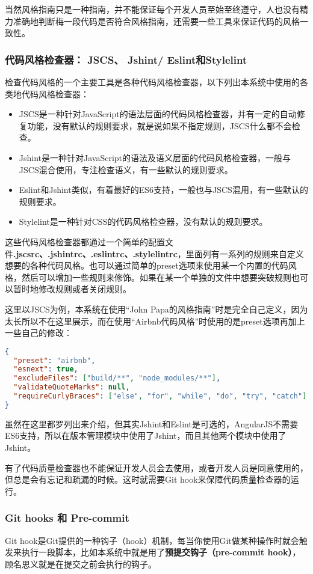 当然风格指南只是一种指南，并不能保证每个开发人员至始至终遵守，人也没有精力准确地判断梅一段代码是否符合风格指南，还需要一些工具来保证代码的风格一致性。
\subsubsection{代码风格检查器： JSCS、 Jshint/ Eslint和Stylelint}
检查代码风格的一个主要工具是各种代码风格检查器，以下列出本系统中使用的各类地代码风格检查器：
\begin{itemize}
  \item JSCS是一种针对JavaScript的语法层面的代码风格检查器，并有一定的自动修复功能，没有默认的规则要求，就是说如果不指定规则，JSCS什么都不会检查。
  \item Jshint是一种针对JavaScript的语法及语义层面的代码风格检查器，一般与JSCS混合使用，专注检查语义，有一些默认的规则要求。
  \item Eslint和Jshint类似，有着最好的ES6支持，一般也与JSCS混用，有一些默认的规则要求。
  \item Stylelint是一种针对CSS的代码风格检查器，没有默认的规则要求。
\end{itemize}

这些代码风格检查器都通过一个简单的配置文件\textbf{.jscsrc、.jshintrc、.eslintrc、.stylelintrc}，里面列有一系列的规则来自定义想要的各种代码风格。也可以通过简单的preset选项来使用某一个内置的代码风格，然后可以增加一些规则来修饰。如果在某一个单独的文件中想要突破规则也可以暂时地修改规则或者关闭规则。

这里以JSCS为例，本系统在使用“John Papa的风格指南”时是完全自己定义，因为太长所以不在这里展示，而在使用“Airbnb代码风格”时使用的是preset选项再加上一些自己的修改：
\begin{lstlisting}[language={json}, caption={Airbnb代码风格JSCS配置}]
{
  "preset": "airbnb",
  "esnext": true,
  "excludeFiles": ["build/**", "node_modules/**"],
  "validateQuoteMarks": null,
  "requireCurlyBraces": ["else", "for", "while", "do", "try", "catch"]
}
\end{lstlisting}

虽然在这里都罗列出来介绍，但其实Jshint和Eslint是可选的，AngularJS不需要ES6支持，所以在版本管理模块中使用了Jshint，而且其他两个模块中使用了Jshint。

有了代码质量检查器也不能保证开发人员会去使用，或者开发人员是同意使用的，但总是会有忘记和疏漏的时候。这时就需要Git hook来保障代码质量检查器的运行。
\subsubsection{Git hooks 和 Pre-commit}
Git hook是Git提供的一种钩子（hook）机制，每当你使用Git做某种操作时就会触发来执行一段脚本，比如本系统中就是用了\textbf{预提交钩子（pre-commit hook）}，顾名思义就是在提交之前会执行的钩子。

